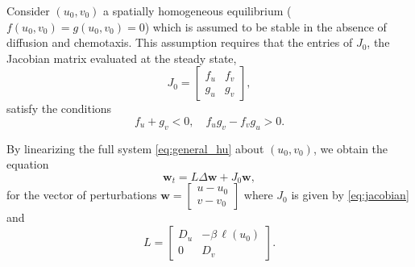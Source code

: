 \documentclass{article}
\begin{document}
Consider $(u_0,v_0)$ a spatially homogeneous equilibrium ($f(u_0,v_0)=g(u_0,v_0) = 0$) which is assumed to be stable in the absence of diffusion and chemotaxis. This assumption requires that the entries of $J_{0}$, the Jacobian matrix evaluated at the steady state,
 \begin{equation}
     \label{eq:jacobian}
     J_{0} = \left [ \begin{array}{cc}
          f_u & f_v \\
          g_u & g_v
     \end{array}
     \right],
\end{equation}  satisfy the conditions 
 \begin{equation}\label{eq:conditions_lin}
f_u + g_v < 0, \quad f_u g_v - f_v g_u > 0.
 \end{equation}
 
 By linearizing the full system \eqref{eq:general_hu} about $(u_0,v_0)$,  we obtain the equation
\begin{equation}
\label{eq:general_full_lin}
   \mathbf{w}_t = L \Delta \mathbf{w} + J_{0} \mathbf{w},
\end{equation}
 for the vector of perturbations  $%
     \mathbf{w} = \left [ \begin{array}{c}
           u - u_0 \\
           v - v_0
     \end{array}
     \right ]
$  where $J_{0}$ is given by \eqref{eq:jacobian} and 
    $$
    L = \left [ \begin{array}{cc}
         D_u & -\beta \,\ell(u_0) \\
         0 & D_v
    \end{array}
    \right].
    $$
\end{document}
